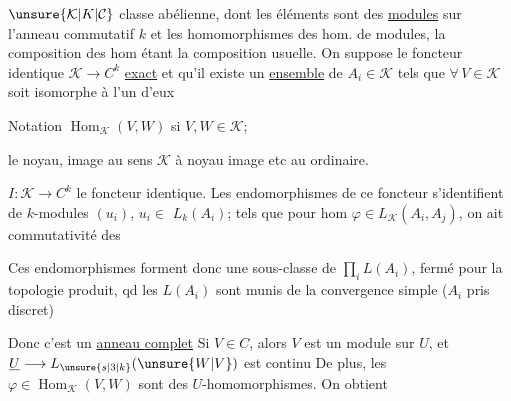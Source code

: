 $\unsure{\mathcal K|K|\mathcal C}$ classe abélienne,  dont les éléments sont des
 \uline{modules} sur l'anneau commutatif $k$
et les homomorphismes des hom. de modules,
la composition des hom étant la composition usuelle.
On suppose le foncteur identique $\mathcal K\longrightarrow C^{k}$ \uline{exact}
et qu'il existe un \uline{ensemble} de $A_i\in\mathcal K$ tels
que $\forall\,V\in\mathcal K$ soit isomorphe à l'un d'eux

Notation $\operatorname{Hom}_{\mathcal K}(V,W)$ si $V,W\in\mathcal K$;

le noyau, image  au sens $\mathcal K$  à noyau
image etc au   ordinaire.

 $I:\mathcal K\longrightarrow C^k$ le foncteur identique. Les endomorphismes
de ce foncteur s'identifient 
 de $k$-modules $(u_i)$, $u_i\in$
$L_k(A_i)$; tels que pour  hom
$\varphi\in L_{\mathcal K}(A_i,A_j)$, on ait commutativité
des

Ces endomorphismes forment donc une
sous-classe  de $\prod_i L(A_i)$, fermé
pour la topologie produit, qd les
$L(A_i)$ sont munis de la convergence simple
($A_i$ pris discret)

Donc c'est un \uline{anneau } 
 \uline{complet}\unsure{,}  Si $V\in C$, alors $V$ est un
module sur $U$, et $\underline U\longrightarrow L_{\unsure{s|3|k}}(\unsure{W|V})$ est continu
De plus, les $\varphi\in\operatorname{Hom}_{\mathcal K}(V,W)$ sont
des $U$-homomorphismes. On obtient

